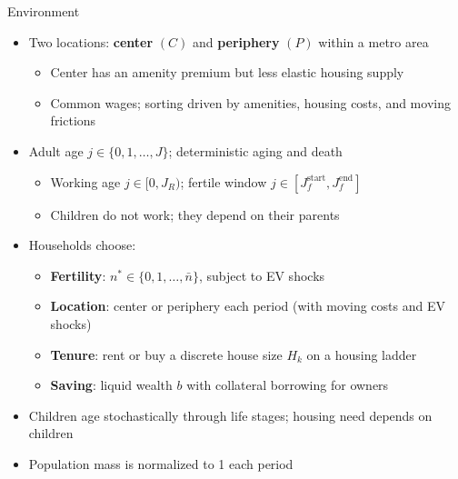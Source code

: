 \documentclass[11pt,aspectratio=169]{beamer}
\begin{document}
\begin{frame}{Environment}
\begin{itemize}
  \item Two locations: \textbf{center} $(C)$ and \textbf{periphery} $(P)$ within a metro area
  \begin{itemize}
    \item Center has an amenity premium but less elastic housing supply
    \item Common wages; sorting driven by amenities, housing costs, and moving frictions
  \end{itemize}
  \item Adult age $j \in \{0,1,\ldots,J\}$; deterministic aging and death
  \begin{itemize}
    \item Working age $j \in [0, J_R)$; fertile window $j \in [J_f^{\mathrm{start}}, J_f^{\mathrm{end}}]$
    \item Children do not work; they depend on their parents
  \end{itemize}
  \item Households choose:
  \begin{itemize}
    \item \textbf{Fertility}: $n^* \in \{0,1,\ldots,\bar n\}$, subject to EV shocks
    \item \textbf{Location}: center or periphery each period (with moving costs and EV shocks)
    \item \textbf{Tenure}: rent or buy a discrete house size $H_k$ on a housing ladder
    \item \textbf{Saving}: liquid wealth $b$ with collateral borrowing for owners
  \end{itemize}
  \item Children age stochastically through life stages; housing need depends on children
  \item Population mass is normalized to 1 each period
\end{itemize}
\end{frame}
\end{document}
